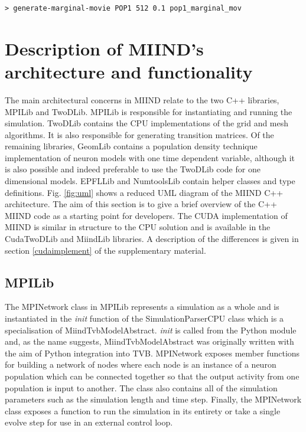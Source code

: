 \documentclass[utf8]{frontiersSCNS} %
\begin{document}
\begin{lstlisting}[language=xml,caption={Generate a marginals movie from the density files of population POP1 with a size of 512 pixels at a simulation replay time step of 0.1s.}]
> generate-marginal-movie POP1 512 0.1 pop1_marginal_mov
\end{lstlisting}

\section{Description of MIIND's architecture and functionality}
The main architectural concerns in MIIND relate to the two C++ libraries, MPILib and TwoDLib. MPILib is responsible for instantiating and running the simulation. TwoDLib contains the CPU implementations of the grid and mesh algorithms. It is also responsible for generating transition matrices. Of the remaining libraries, GeomLib contains a population density technique implementation of neuron models with one time dependent variable, although it is also possible and indeed preferable to use the TwoDLib code for one dimensional models. EPFLLib and NumtoolsLib contain helper classes and type definitions. Fig. \ref{fig:uml} shows a reduced UML diagram of the MIIND C++ architecture. The aim of this section is to give a brief overview of the C++ MIIND code as a starting point for developers. The CUDA implementation of MIIND is similar in structure to the CPU solution and is available in the CudaTwoDLib and MiindLib libraries. A description of the differences is given in section \ref{cudaimplement} of the supplementary material.

\subsection{MPILib}

The MPINetwork class in MPILib represents a simulation as a whole and is instantiated in the \textit{init} function of the SimulationParserCPU class which is a specialisation of MiindTvbModelAbstract. \textit{init} is called from the Python module and, as the name suggests, MiindTvbModelAbstract was originally written with the aim of Python integration into TVB. MPINetwork exposes member functions for building a network of nodes where each node is an instance of a neuron population which can be connected together so that the output activity from one population is input to another. The class also contains all of the simulation parameters such as the simulation length and time step. Finally, the MPINetwork class exposes a function to run the simulation in its entirety or take a single evolve step for use in an external control loop.
\end{document}
